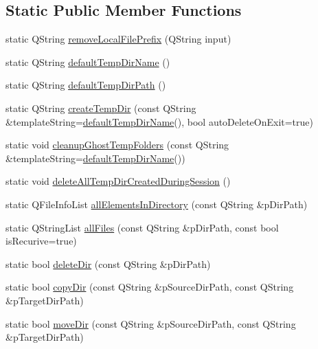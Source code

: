 \subsection*{Static Public Member Functions}
\begin{DoxyCompactItemize}
\item 
static Q\-String \hyperlink{class_u_b_file_system_utils_a91642f5fb7ac65e5528ecb75724ee7d3}{remove\-Local\-File\-Prefix} (Q\-String input)
\item 
static Q\-String \hyperlink{class_u_b_file_system_utils_a6610153e0b047c180af280a834dd084d}{default\-Temp\-Dir\-Name} ()
\item 
static Q\-String \hyperlink{class_u_b_file_system_utils_a077517980ac1053b24899243e3bc44f6}{default\-Temp\-Dir\-Path} ()
\item 
static Q\-String \hyperlink{class_u_b_file_system_utils_aa3c7075cc43aa4b8dcefd7d06fab2d6a}{create\-Temp\-Dir} (const Q\-String \&template\-String=\hyperlink{class_u_b_file_system_utils_a6610153e0b047c180af280a834dd084d}{default\-Temp\-Dir\-Name}(), bool auto\-Delete\-On\-Exit=true)
\item 
static void \hyperlink{class_u_b_file_system_utils_a03cdf9e2730f398f84c8da53d723d024}{cleanup\-Ghost\-Temp\-Folders} (const Q\-String \&template\-String=\hyperlink{class_u_b_file_system_utils_a6610153e0b047c180af280a834dd084d}{default\-Temp\-Dir\-Name}())
\item 
static void \hyperlink{class_u_b_file_system_utils_a4b0389e1d6df341057d6d1db1ab590e2}{delete\-All\-Temp\-Dir\-Created\-During\-Session} ()
\item 
static Q\-File\-Info\-List \hyperlink{class_u_b_file_system_utils_a3292b192159361f21da665022c20ee32}{all\-Elements\-In\-Directory} (const Q\-String \&p\-Dir\-Path)
\item 
static Q\-String\-List \hyperlink{class_u_b_file_system_utils_a0116cc080d1cb3ef854125e0088c8cf6}{all\-Files} (const Q\-String \&p\-Dir\-Path, const bool is\-Recurive=true)
\item 
static bool \hyperlink{class_u_b_file_system_utils_aff7b8489683cdec07a5ad696571138f4}{delete\-Dir} (const Q\-String \&p\-Dir\-Path)
\item 
static bool \hyperlink{class_u_b_file_system_utils_a8289391e8ff8c366727435455aa8a733}{copy\-Dir} (const Q\-String \&p\-Source\-Dir\-Path, const Q\-String \&p\-Target\-Dir\-Path)
\item 
static bool \hyperlink{class_u_b_file_system_utils_ac51caad73e9faf9a9828a6034fa139da}{move\-Dir} (const Q\-String \&p\-Source\-Dir\-Path, const Q\-String \&p\-Target\-Dir\-Path)

\end{DoxyCompactItemize}
